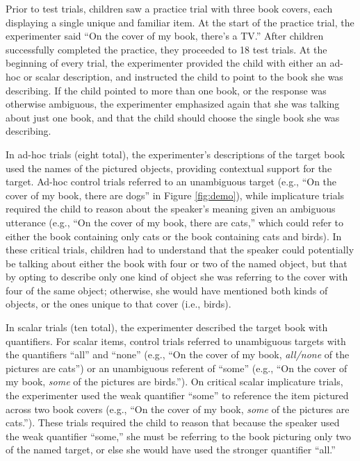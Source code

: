 \documentclass[man]{apa2}
\begin{document}
Prior to test trials, children saw a practice trial with three book covers, each displaying a single unique and familiar item. At the start of the practice trial, the experimenter said ``On the cover of my book, there's a TV.'' After children successfully completed the practice, they proceeded to 18 test trials. At the beginning of every trial, the experimenter provided the child with either an ad-hoc or scalar description, and instructed the child to point to the book she was describing. If the child pointed to more than one book, or the response was otherwise ambiguous, the experimenter emphasized again that she was talking about just one book, and that the child should choose the single book she was describing.

In ad-hoc trials (eight total), the experimenter's descriptions of the target book used the names of the pictured objects, providing contextual support for the target. Ad-hoc control trials referred to an unambiguous target (e.g., ``On the cover of my book, there are dogs'' in Figure \ref{fig:demo}), while implicature trials required the child to reason about the speaker's meaning given an ambiguous utterance (e.g., ``On the cover of my book, there are cats,'' which could refer to either the book containing only cats or the book containing cats and birds). In these critical trials, children had to understand that the speaker could potentially be talking about either the book with four or two of the named object, but that by opting to describe only one kind of object she was referring to the cover with four of the same object; otherwise, she would have mentioned both kinds of objects, or the ones unique to that cover (i.e., birds).

In scalar trials (ten total), the experimenter described the target book with quantifiers. For scalar items, control trials referred to unambiguous targets with the quantifiers ``all'' and ``none'' (e.g., ``On the cover of my book, \textit{all/none} of the pictures are cats'') or an unambiguous referent of ``some'' (e.g., ``On the cover of my book, \textit{some} of the pictures are birds.''). On critical scalar implicature trials, the experimenter used the weak quantifier ``some'' to reference the item pictured across two book covers (e.g., ``On the cover of my book, \textit{some} of the pictures are cats.''). These trials required the child to reason that because the speaker used the weak quantifier ``some,'' she must be referring to the book picturing only two of the named target, or else she would have used the stronger quantifier ``all.''
\end{document}
